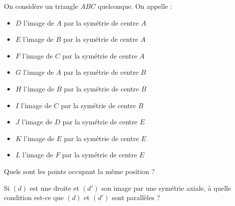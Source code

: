 \newpage

On considère un triangle $ABC$ quelconque. On appelle :
\begin{itemize}
    \item $D$ l'image de $A$ par la symétrie de centre $A$
    \item $E$ l'image de $B$ par la symétrie de centre $A$
    \item $F$ l'image de $C$ par la symétrie de centre $A$
    \item $G$ l'image de $A$ par la symétrie de centre $B$
    \item $H$ l'image de $B$ par la symétrie de centre $B$
    \item $I$ l'image de $C$ par la symétrie de centre $B$
    \item $J$ l'image de $D$ par la symétrie de centre $E$
    \item $K$ l'image de $E$ par la symétrie de centre $E$
    \item $L$ l'image de $F$ par la symétrie de centre $E$
\end{itemize}

Quels sont les points occupant la même position ?

    
Si $(d)$ est une droite et $(d')$ son image par une symétrie axiale, à quelle condition est-ce que $(d)$ et $(d')$ sont parallèles ?
